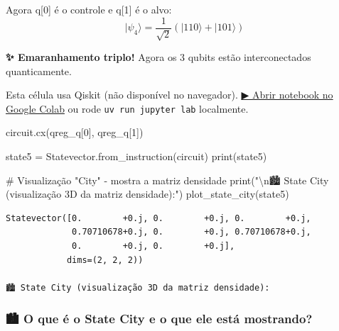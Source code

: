 \documentclass[
  brazilian,
]{report}
\newenvironment{Shaded}{\begin{snugshade}}{\end{snugshade}}
\newcommand{\BuiltInTok}[1]{\textcolor[rgb]{0.00,0.23,0.31}{#1}}
\newcommand{\CharTok}[1]{\textcolor[rgb]{0.13,0.47,0.30}{#1}}
\newcommand{\CommentTok}[1]{\textcolor[rgb]{0.37,0.37,0.37}{#1}}
\newcommand{\DecValTok}[1]{\textcolor[rgb]{0.68,0.00,0.00}{#1}}
\newcommand{\NormalTok}[1]{\textcolor[rgb]{0.00,0.23,0.31}{#1}}
\newcommand{\OperatorTok}[1]{\textcolor[rgb]{0.37,0.37,0.37}{#1}}
\newcommand{\StringTok}[1]{\textcolor[rgb]{0.13,0.47,0.30}{#1}}
\begin{document}
Agora q{[}0{]} é o controle e q{[}1{]} é o alvo:
\[|\psi_4\rangle = \frac{1}{\sqrt{2}}(|110\rangle + |101\rangle)\]

\textbf{✨ Emaranhamento triplo!} Agora os 3 qubits estão
interconectados quanticamente.

\begin{tcolorbox}[enhanced jigsaw, arc=.35mm, bottomrule=.15mm, bottomtitle=1mm, breakable, colback=white, colbacktitle=quarto-callout-warning-color!10!white, colframe=quarto-callout-warning-color-frame, coltitle=black, left=2mm, leftrule=.75mm, opacityback=0, opacitybacktitle=0.6, rightrule=.15mm, title=\textcolor{quarto-callout-warning-color}{\faExclamationTriangle}\hspace{0.5em}{⚛️ Célula Qiskit --- execute no Colab ou localmente}, titlerule=0mm, toprule=.15mm, toptitle=1mm]

Esta célula usa Qiskit (não disponível no navegador).
\href{https://colab.research.google.com/github/maxwellamaral/aula-quantum/blob/main/notebooks/02-teletransport.ipynb}{▶
Abrir notebook no Google Colab} ou rode \texttt{uv\ run\ jupyter\ lab}
localmente.

\begin{Shaded}
\begin{Highlighting}[]

\NormalTok{circuit.cx(qreg\_q[}\DecValTok{0}\NormalTok{], qreg\_q[}\DecValTok{1}\NormalTok{])}

\NormalTok{state5 }\OperatorTok{=}\NormalTok{ Statevector.from\_instruction(circuit)}
\BuiltInTok{print}\NormalTok{(state5)}

\CommentTok{\# Visualização "City" {-} mostra a matriz densidade}
\BuiltInTok{print}\NormalTok{(}\StringTok{"}\CharTok{\textbackslash{}n}\StringTok{🏙️ State City (visualização 3D da matriz densidade):"}\NormalTok{)}
\NormalTok{plot\_state\_city(state5)}
\end{Highlighting}
\end{Shaded}

\end{tcolorbox}

\begin{verbatim}
Statevector([0.        +0.j, 0.        +0.j, 0.        +0.j,
             0.70710678+0.j, 0.        +0.j, 0.70710678+0.j,
             0.        +0.j, 0.        +0.j],
            dims=(2, 2, 2))

🏙️ State City (visualização 3D da matriz densidade):
\end{verbatim}

\subsubsection{🏙️ O que é o State City e o que ele está
mostrando?}\label{o-que-uxe9-o-state-city-e-o-que-ele-estuxe1-mostrando}
\end{document}
